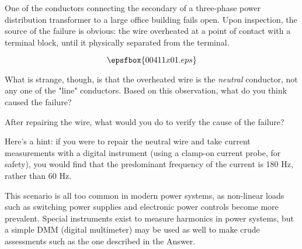 

One of the conductors connecting the secondary of a three-phase power distribution transformer to a large office building fails open.  Upon inspection, the source of the failure is obvious: the wire overheated at a point of contact with a terminal block, until it physically separated from the terminal.

$$\epsfbox{00411x01.eps}$$

What is strange, though, is that the overheated wire is the {\it neutral} conductor, not any one of the "line" conductors.  Based on this observation, what do you think caused the failure?

After repairing the wire, what would you do to verify the cause of the failure?







Here's a hint: if you were to repair the neutral wire and take current measurements with a digital instrument (using a clamp-on current probe, for safety), you would find that the predominant frequency of the current is 180 Hz, rather than 60 Hz.







This scenario is all too common in modern power systems, as non-linear loads such as switching power supplies and electronic power controls become more prevalent.  Special instruments exist to measure harmonics in power systems, but a simple DMM (digital multimeter) may be used as well to make crude assessments such as the one described in the Answer.




